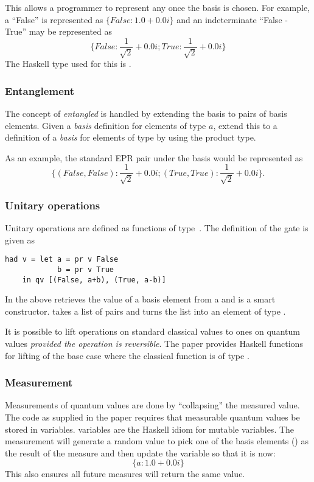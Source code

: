 This allows a programmer to represent any \qbit{} once the basis is chosen. 
For example, a ``False'' \qbit{} is represented as $\{False: 1.0+0.0i\}$ and
an indeterminate ``False - True'' \qbit{} may be represented as
\[\{False:\frac{1}{\sqrt{2}}+0.0i;True:\frac{1}{\sqrt{2}}+0.0i\}\]
The Haskell type used for this is .

\subsubsection{Entanglement}
The concept of \emph{entangled} \qbits{} is handled by extending the 
basis to pairs of basis elements. Given a \emph{basis} definition
for elements of type $a$, extend this to a definition of a \emph{basis}
for  elements of 
type  by using the product type.

As an example, the standard EPR pair under the 
 basis would be
represented as
\[\{(False,False):\frac{1}{\sqrt{2}}+0.0i;(True,True):\frac{1}{\sqrt{2}}+0.0i\}.\]
\subsubsection{Unitary operations}
Unitary operations are defined as functions of 
type~. The 
definition of the \Had{} gate is given as 

{\begin{singlespace}
\begin{lstlisting}[style=hskl]
had v = let a = pr v False
            b = pr v True
	in qv [(False, a+b), (True, a-b)]
\end{lstlisting}
\end{singlespace}
}

In the above  retrieves the value of a 
basis element from a \qbit{} and 
 is a smart constructor.  takes a 
list of  pairs
and turns the list into an element of type .

It is possible to lift operations on standard classical values to ones
on quantum values \emph{provided the operation is reversible}.  The paper 
provides Haskell functions
 for lifting of the base case where the classical
function is of type .
\subsubsection{Measurement}
Measurements of quantum values are done by  ``collapsing'' the 
measured value. The code as supplied in the paper requires that measurable 
quantum values be stored in  variables. 
variables are the Haskell idiom for mutable variables. The measurement
will generate a random value to pick one of the basis elements ()
 as the result of the measure and then update the variable so 
that it is now:
\[\{a:1.0+0.0i\}\]
This also ensures all future measures will return the same value.
